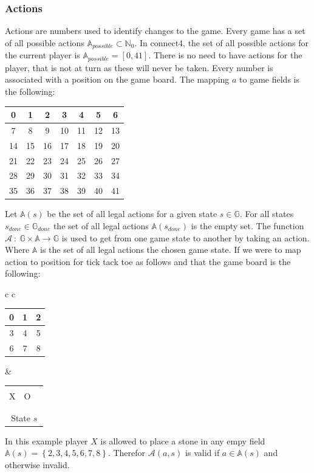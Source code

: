 \documentclass[12pt]{article}
\newcommand{\tickTackToe}[9]{
\begin{tabular}{p{7px}|p{7px}|p{7px}}
\multicolumn{3}{c}{}\\
  #1 & #2 & #3 \\      \hline
  #4 & #5 & #6 \\      \hline
   & #7 & #8\\
\multicolumn{3}{c}{#9}
\end{tabular}
}
\begin{document}
\subsubsection{Actions}
Actions are numbers used to identify changes to the game. Every game has a set of all possible actions \(\mathbb{A}_{possible} \subset \mathbb{N}_0\). In connect4, the set of all possible actions for the current player is \(\mathbb{A}_{possible} = [0, 41]\). There is no need to have actions for the player, that is not at turn as these will never be taken. Every number is associated with a position on the game board. The mapping \(a\) to game fields is the following:
\begin{center}
\begin{tabular}{| c | c | c | c | c | c | c |}
 \hline
0 & 1 & 2 & 3 & 4 & 5 & 6  \\\hline
7 & 8 & 9 & 10 & 11 & 12 & 13\\\hline
14 & 15 & 16 & 17 & 18 & 19 & 20 \\\hline
21 & 22 & 23& 24 & 25 & 26 & 27 \\\hline
28 & 29 & 30 & 31 & 32 & 33 & 34 \\\hline
35 & 36 & 37 & 38 & 39 & 40 & 41 \\\hline
\end{tabular}
\end{center}
Let \(\mathbb{A}(s)\) be the set of all legal actions for a given state  \(s \in \mathbb{G}\). For all states \(s_{done} \in \mathbb{G}_{done}\) the set of all legal actions \(\mathbb{A}(s_{done})\) is the empty set. The function \(\mathcal{A}~:~\mathbb{G}\times\mathbb{A}\to\mathbb{G}\) is used to get from one game state to another by taking an action. Where \(\mathbb A\) is the set of all legal actions the chosen game state. If we were to map action to position for tick tack toe as follows and that the game board is the following:
\begin{center}\begin{tabular} { c c }
\begin{tabular}{| c | c | c |}
 \hline
 0 & 1 & 2 \\\hline
 3 & 4 & 5 \\\hline
 6 & 7 & 8 \\\hline
\end{tabular} & \tickTackToe{X}{O}{}{}{}{}{}{}{State \(s\)}
\end{tabular}\end{center}
In this example player \(X\) is allowed to place a stone in any empy field \(\mathbb A(s) = \left\{ 2, 3, 4, 5, 6, 7, 8 \right\}\). Therefor \(\mathcal A(a, s)\) is valid if \(a \in \mathbb A(s)\) and otherwise invalid.
\end{document}
